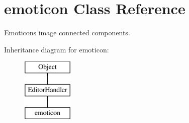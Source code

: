 \hypertarget{classemoticon}{\section{emoticon Class Reference}
\label{classemoticon}
}


Emoticons image connected components.  


Inheritance diagram for emoticon\-:\begin{figure}[H]
\begin{center}
\leavevmode
\includegraphics[height=3.000000cm]{classemoticon}
\end{center}
\end{figure}
